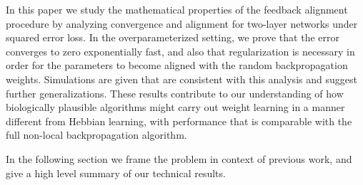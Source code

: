 In this paper we study the mathematical properties of the feedback alignment procedure by analyzing convergence and alignment for two-layer networks under squared error loss. In the overparameterized setting, we prove that the error converges to zero exponentially fast, and also that regularization is necessary in order for the  parameters to become aligned with the random backpropagation weights. Simulations are given that are consistent with this analysis and suggest further generalizations. These results contribute to our understanding of how biologically plausible algorithms might carry out weight learning in a manner different from Hebbian learning, with performance that is comparable with the full non-local backpropagation algorithm.


In the following section we frame the problem in context of previous work, and give
a high level summary of our technical results.
